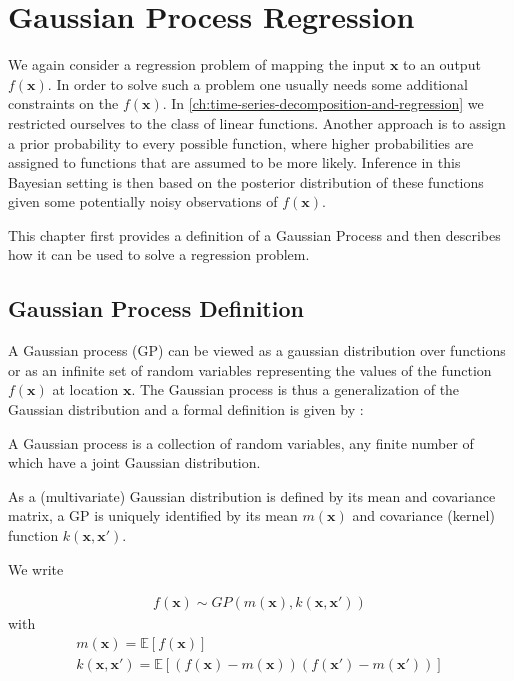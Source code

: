 \chapter{Gaussian Process Regression}\label{ch:gaussian-process-regression}


We again consider a regression problem of mapping the input $\mathbf{x}$ to an output $f(\mathbf{x})$.
In order to solve such a problem one usually needs some additional constraints on the $f(\mathbf{x})$.
In \ref{ch:time-series-decomposition-and-regression} we restricted ourselves to the class of linear functions.
Another approach is to assign a prior probability to every possible function, where higher
probabilities are assigned to functions that are assumed to be more likely.
Inference in this Bayesian setting is then based on the posterior distribution of these
functions given some potentially noisy observations of $f(\mathbf{x})$.

This chapter first provides a definition of a Gaussian Process and then describes how it
can be used to solve a regression problem.

\section{Gaussian Process Definition}\label{sec:gaussian-process-definition}

A Gaussian process (GP) can be viewed as a gaussian distribution over functions or as an infinite set of random
variables representing the values of the function $f(\mathbf{x})$ at location $\mathbf{x}$.
The Gaussian process is thus a generalization of the Gaussian distribution and a formal definition is given
by \citeauthor{rasmussen_gaussian_2006} :

\begin{definition}\label{def:GP}
 A Gaussian process is a collection of random variables, any finite number of which have a joint Gaussian distribution.
\end{definition}


As a (multivariate) Gaussian distribution is defined by its mean and covariance matrix, a GP is
uniquely identified by its mean $m(\mathbf{x})$ and covariance (kernel) function $k(\mathbf{x},\mathbf{x}')$.

We write

\begin{gather*}
    f(\mathbf{x}) \sim GP(m(\mathbf{x}), k(\mathbf{x},\mathbf{x}'))
\end{gather*}
with
\begin{gather*}
    m(\mathbf{x}) = \mathbb{E}[f(\mathbf{x})] \\
    k(\mathbf{x},\mathbf{x}') = \mathbb{E}[(f(\mathbf{x})-m(\mathbf{x}))(f(\mathbf{x}')-m(\mathbf{x}'))]
\end{gather*}

